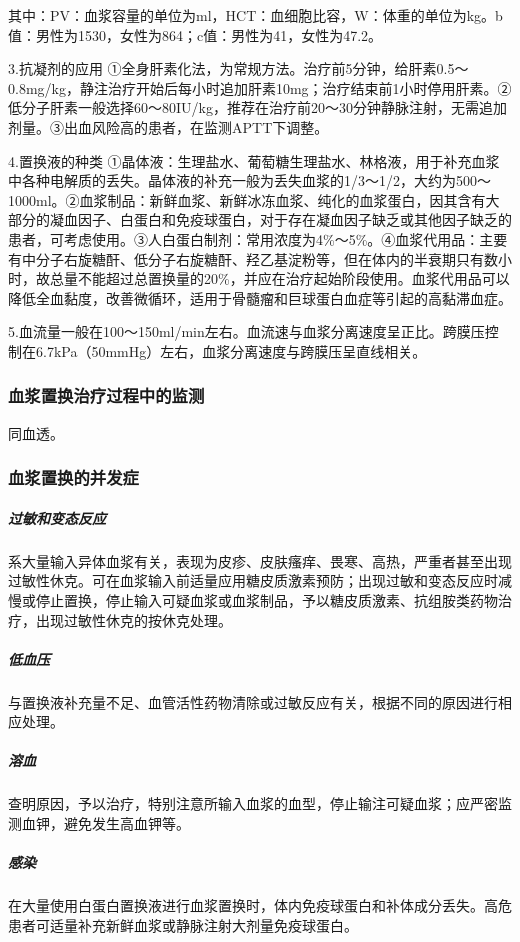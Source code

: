 其中：PV：血浆容量的单位为ml，HCT：血细胞比容，W：体重的单位为kg。b值：男性为1530，女性为864；c值：男性为41，女性为47.2。

3.抗凝剂的应用
①全身肝素化法，为常规方法。治疗前5分钟，给肝素0.5～0.8mg/kg，静注治疗开始后每小时追加肝素10mg；治疗结束前1小时停用肝素。②低分子肝素一般选择60～80IU/kg，推荐在治疗前20～30分钟静脉注射，无需追加剂量。③出血风险高的患者，在监测APTT下调整。

4.置换液的种类
①晶体液：生理盐水、葡萄糖生理盐水、林格液，用于补充血浆中各种电解质的丢失。晶体液的补充一般为丢失血浆的1/3～1/2，大约为500～1000ml。②血浆制品：新鲜血浆、新鲜冰冻血浆、纯化的血浆蛋白，因其含有大部分的凝血因子、白蛋白和免疫球蛋白，对于存在凝血因子缺乏或其他因子缺乏的患者，可考虑使用。③人白蛋白制剂：常用浓度为4\%～5\%。④血浆代用品：主要有中分子右旋糖酐、低分子右旋糖酐、羟乙基淀粉等，但在体内的半衰期只有数小时，故总量不能超过总置换量的20\%，并应在治疗起始阶段使用。血浆代用品可以降低全血黏度，改善微循环，适用于骨髓瘤和巨球蛋白血症等引起的高黏滞血症。

5.血流量一般在100～150ml/min左右。血流速与血浆分离速度呈正比。跨膜压控制在6.7kPa（50mmHg）左右，血浆分离速度与跨膜压呈直线相关。

\subsubsection{血浆置换治疗过程中的监测}

同血透。

\subsubsection{血浆置换的并发症}

\subparagraph{过敏和变态反应}

系大量输入异体血浆有关，表现为皮疹、皮肤瘙痒、畏寒、高热，严重者甚至出现过敏性休克。可在血浆输入前适量应用糖皮质激素预防；出现过敏和变态反应时减慢或停止置换，停止输入可疑血浆或血浆制品，予以糖皮质激素、抗组胺类药物治疗，出现过敏性休克的按休克处理。

\subparagraph{低血压}

与置换液补充量不足、血管活性药物清除或过敏反应有关，根据不同的原因进行相应处理。

\subparagraph{溶血}

查明原因，予以治疗，特别注意所输入血浆的血型，停止输注可疑血浆；应严密监测血钾，避免发生高血钾等。

\subparagraph{感染}

在大量使用白蛋白置换液进行血浆置换时，体内免疫球蛋白和补体成分丢失。高危患者可适量补充新鲜血浆或静脉注射大剂量免疫球蛋白。

